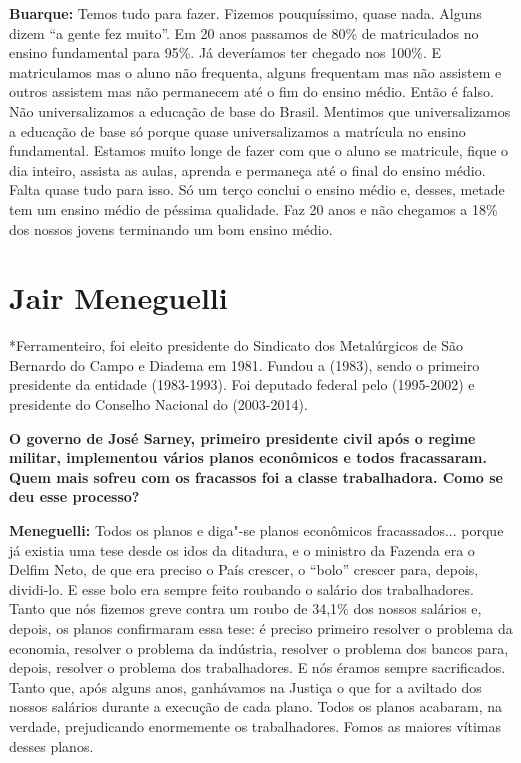 \textbf{Buarque:} Temos tudo para fazer. Fizemos pouquíssimo, quase
nada. Alguns dizem ``a gente fez muito''. Em 20 anos passamos de 80\% de
matriculados no ensino fundamental para 95\%. Já deveríamos ter chegado
nos 100\%. E matriculamos mas o aluno não frequenta, alguns frequentam
mas não assistem e outros assistem mas não permanecem até o fim do
ensino médio. Então é falso. Não universalizamos a educação de base do
Brasil. Mentimos que universalizamos a educação de base só porque quase
universalizamos a matrícula no ensino fundamental. Estamos muito longe
de fazer com que o aluno se matricule, fique o dia inteiro, assista as
aulas, aprenda e permaneça até o final do ensino médio. Falta quase tudo
para isso. Só um terço conclui o ensino médio e, desses, metade tem um
ensino médio de péssima qualidade. Faz 20 anos e não chegamos a 18\% dos
nossos jovens terminando um bom ensino médio.

\chapter{Jair Meneguelli}

*Ferramenteiro, foi eleito presidente do Sindicato dos Metalúrgicos de
São Bernardo do Campo e Diadema em 1981. Fundou a  (1983), sendo o
primeiro presidente da entidade (1983-1993). Foi deputado federal pelo
 (1995-2002) e presidente do Conselho Nacional do  (2003-2014).

\textbf{O governo de José Sarney, primeiro presidente civil após o
regime militar, implementou vários planos econômicos e todos
fracassaram. Quem mais sofreu com os fracassos foi a classe
trabalhadora. Como se deu esse processo?}

\textbf{Meneguelli:} Todos os planos e diga"-se planos econômicos
fracassados... porque já existia uma tese desde os idos da ditadura, e o
ministro da Fazenda era o Delfim Neto, de que era preciso o País
crescer, o ``bolo'' crescer para, depois, dividi-lo. E esse bolo era
sempre feito roubando o salário dos trabalhadores. Tanto que nós fizemos
greve contra um roubo de 34,1\% dos nossos salários e, depois, os planos
confirmaram essa tese: é preciso primeiro resolver o problema da
economia, resolver o problema da indústria, resolver o problema dos
bancos para, depois, resolver o problema dos trabalhadores. E nós éramos
sempre sacrificados. Tanto que, após alguns anos, ganhávamos na Justiça
o que for a aviltado dos nossos salários durante a execução de cada
plano. Todos os planos acabaram, na verdade, prejudicando enormemente os
trabalhadores. Fomos as maiores vítimas desses planos.

